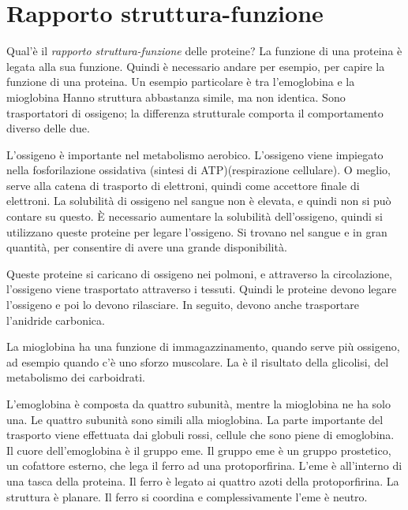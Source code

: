 \chapter{Rapporto struttura-funzione}


Qual'è il \emph{rapporto struttura-funzione} delle proteine?
La funzione di una proteina è legata alla sua funzione. Quindi è
necessario andare per esempio, per capire la funzione di una proteina.
Un esempio particolare è tra l'emoglobina e la mioglobina Hanno
struttura abbastanza simile, ma non identica. Sono trasportatori di
ossigeno; la differenza strutturale comporta il comportamento diverso
delle due.

L'ossigeno è importante nel metabolismo aerobico. L'ossigeno viene
impiegato nella fosforilazione ossidativa (sintesi di ATP)(respirazione
cellulare). O meglio, serve alla catena di trasporto di elettroni,
quindi come accettore finale di elettroni.
La solubilità di ossigeno nel sangue non è elevata, e quindi non si può
contare su questo. È necessario aumentare la solubilità dell'ossigeno,
quindi si utilizzano queste proteine per legare l'ossigeno. Si trovano
nel sangue e in gran quantità, per consentire di avere una grande
disponibilità.

Queste proteine si caricano di ossigeno nei polmoni, e attraverso la
circolazione, l'ossigeno viene trasportato attraverso i tessuti. Quindi
le proteine devono legare l'ossigeno e poi lo devono rilasciare.
In seguito, devono anche trasportare l'anidride carbonica.

La mioglobina ha una funzione di immagazzinamento, quando serve più
ossigeno, ad esempio quando c'è uno sforzo muscolare.
La  è il risultato della glicolisi, del metabolismo dei carboidrati.

L'emoglobina è composta da quattro subunità, mentre la mioglobina ne ha
solo una. Le quattro subunità sono simili alla mioglobina.
La parte importante del trasporto viene effettuata dai globuli rossi,
cellule che sono piene di emoglobina.
Il cuore dell'emoglobina è il gruppo eme. Il gruppo eme è un gruppo prostetico,
un cofattore esterno, che lega il ferro ad una protoporfirina. L'eme
è all'interno di una tasca della proteina.
Il ferro è legato ai quattro azoti della protoporfirina. La struttura è
planare. Il ferro si coordina e complessivamente l'eme è neutro.


